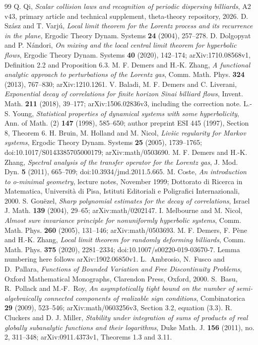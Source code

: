 \begin{thebibliography}{99}
 Q. Qi, \emph{Scalar collision laws and recognition of periodic dispersing billiards}, A2 v43, primary article and technical supplement, theta-theory repository, 2026.
 D. Sz\'asz and T. Varj\'u, \emph{Local limit theorem for the Lorentz process and its recurrence in the plane}, Ergodic Theory Dynam. Systems \textbf{24} (2004), 257--278.
 D. Dolgopyat and P. N\'andori, \emph{On mixing and the local central limit theorem for hyperbolic flows}, Ergodic Theory Dynam. Systems \textbf{40} (2020), 142--174; arXiv:1710.08568v1, Definition 2.2 and Proposition 6.3.
 M. F. Demers and H.-K. Zhang, \emph{A functional analytic approach to perturbations of the Lorentz gas}, Comm. Math. Phys. \textbf{324} (2013), 767--830; arXiv:1210.1261.
 V. Baladi, M. F. Demers and C. Liverani, \emph{Exponential decay of correlations for finite horizon Sinai billiard flows}, Invent. Math. \textbf{211} (2018), 39--177; arXiv:1506.02836v3, including the correction note.
 L.-S. Young, \emph{Statistical properties of dynamical systems with some hyperbolicity}, Ann. of Math. (2) \textbf{147} (1998), 585--650; author preprint ESI 445 (1997), Section 8, Theorem 6.
 H. Bruin, M. Holland and M. Nicol, \emph{Liv\v{s}ic regularity for Markov systems}, Ergodic Theory Dynam. Systems \textbf{25} (2005), 1739--1765; doi:10.1017/S0143385705000179; arXiv:math/0503690.
 M. F. Demers and H.-K. Zhang, \emph{Spectral analysis of the transfer operator for the Lorentz gas}, J. Mod. Dyn. \textbf{5} (2011), 665--709; doi:10.3934/jmd.2011.5.665.
 M. Coste, \emph{An introduction to o-minimal geometry}, lecture notes, November 1999; Dottorato di Ricerca in Matematica, Universit\`a di Pisa, Istituti Editoriali e Poligrafici Internazionali, 2000.
 S. Gou\"ezel, \emph{Sharp polynomial estimates for the decay of correlations}, Israel J. Math. \textbf{139} (2004), 29--65; arXiv:math/0202147.
 I. Melbourne and M. Nicol, \emph{Almost sure invariance principle for nonuniformly hyperbolic systems}, Comm. Math. Phys. \textbf{260} (2005), 131--146; arXiv:math/0503693.
 M. F. Demers, F. P\`ene and H.-K. Zhang, \emph{Local limit theorem for randomly deforming billiards}, Comm. Math. Phys. \textbf{375} (2020), 2281--2334; doi:10.1007/s00220-019-03670-7. Lemma numbering here follows arXiv:1902.06850v1.
L.~Ambrosio, N.~Fusco and D.~Pallara,
\emph{Functions of Bounded Variation and Free Discontinuity Problems},
Oxford Mathematical Monographs, Clarendon Press, Oxford, 2000.
S.~Basu, R.~Pollack and M.-F.~Roy,
\emph{An asymptotically tight bound on the number of semi-algebraically
connected components of realizable sign conditions},
Combinatorica \textbf{29} (2009), 523--546;
arXiv:math/0603256v3, Section 3.2, equation (3.3).
 R. Cluckers and D. J. Miller,
\emph{Stability under integration of sums of products of real globally
subanalytic functions and their logarithms}, Duke Math. J. \textbf{156}
(2011), no. 2, 311--348; arXiv:0911.4373v1, Theorems 1.3 and 3.11.


\end{thebibliography}
